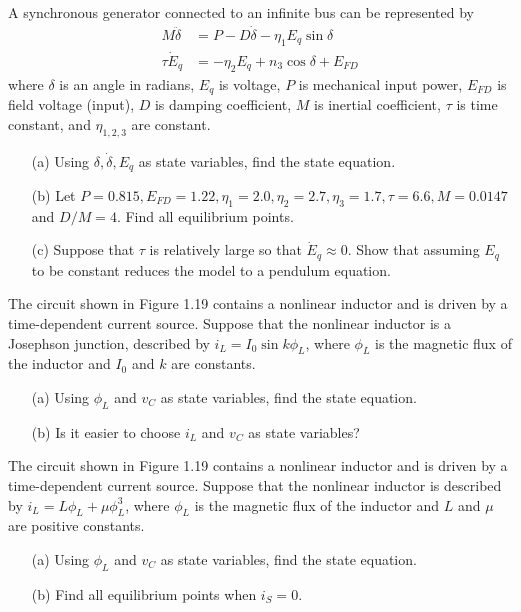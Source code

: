\begin{exer}
A synchronous generator connected to an infinite bus can be represented by
\begin{align*}
M\ddot{\delta} &= P - D\dot{\delta} - \eta_1E_q\sin\delta \\
\tau\dot{E}_q  &= -\eta_2E_q + n_3\cos\delta + E_{FD}
\end{align*}
where $\delta$ is an angle in radians, $E_q$ is voltage, $P$ is mechanical input 
power, $E_{FD}$ is field voltage (input), $D$ is damping coefficient, $M$ is
inertial coefficient, $\tau$ is time constant, and $\eta_{1,2,3}$ are constant.
\begin{enumerate}
\item[(a)] Using $\delta, \dot{\delta}, E_q$ as state variables, find the state
equation.
\item[(b)] Let $P=0.815,E_{FD}=1.22,\eta_1=2.0,\eta_2=2.7,\eta_3=1.7,\tau=6.6,M=0.0147$
and $D/M=4$. Find all equilibrium points.
\item[(c)] Suppose that $\tau$ is relatively large so that $\dot{E}_q\approx 0.$ 
Show that assuming $E_q$ to be constant reduces the model to a pendulum equation.
\end{enumerate}
\end{exer}

\begin{exer}
The circuit shown in Figure 1.19 contains a nonlinear inductor and is driven by
a time-dependent current source. Suppose that the nonlinear inductor is a 
Josephson junction, described by $i_L=I_0\sin k\phi_L$, where $\phi_L$ is the 
magnetic flux of the inductor and $I_0$ and $k$ are constants.
\begin{enumerate}
\item[(a)] Using $\phi_L$ and $v_C$ as state variables, find the state equation.
\item[(b)] Is it easier to choose $i_L$ and $v_C$ as state variables?
\end{enumerate}
\end{exer}

\begin{exer}
The circuit shown in Figure 1.19 contains a nonlinear inductor and is driven by 
a time-dependent current source. Suppose that the nonlinear inductor is described
by $i_L=L\phi_L+\mu\phi_L^3$, where $\phi_L$ is the magnetic flux of the inductor
and $L$ and $\mu$ are positive constants.
\begin{enumerate}
\item[(a)] Using $\phi_L$ and $v_C$ as state variables, find the state equation.
\item[(b)] Find all equilibrium points when $i_S=0$.
\end{enumerate}
\end{exer}

